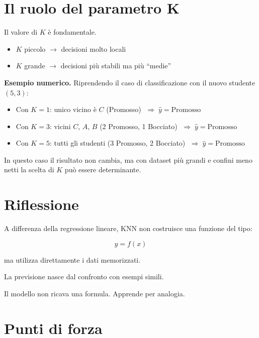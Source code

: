\documentclass{article}
\begin{document}
	\section*{Il ruolo del parametro K}
	
	Il valore di $K$ è fondamentale.
	
	\begin{itemize}
		\item $K$ piccolo $\rightarrow$ decisioni molto locali
		\item $K$ grande $\rightarrow$ decisioni più stabili ma più ``medie''
	\end{itemize}
	
	\textbf{Esempio numerico.} Riprendendo il caso di classificazione con il nuovo studente $(5,3)$:
	
	\begin{itemize}
		\item Con $K=1$: unico vicino è $C$ (Promosso) $\;\Rightarrow\; \hat{y} = \text{Promosso}$
		\item Con $K=3$: vicini $C$, $A$, $B$ (2 Promosso, 1 Bocciato) $\;\Rightarrow\; \hat{y} = \text{Promosso}$
		\item Con $K=5$: tutti gli studenti (3 Promosso, 2 Bocciato) $\;\Rightarrow\; \hat{y} = \text{Promosso}$
	\end{itemize}
	
	In questo caso il risultato non cambia, ma con dataset più grandi e confini meno netti la scelta di $K$ può essere determinante.
	
	\section*{Riflessione}
	
	A differenza della regressione lineare, KNN non costruisce una funzione del tipo:
	
	\[
	y = f(x)
	\]
	
	ma utilizza direttamente i dati memorizzati.
	
	La previsione nasce dal confronto con esempi simili.
	
	\begin{center}
		Il modello non ricava una formula. Apprende per analogia.
	\end{center}
	
	\section*{Punti di forza}
	
\end{document}
